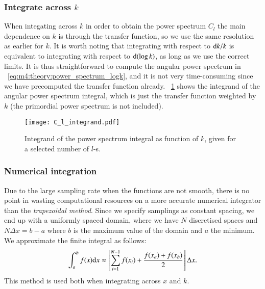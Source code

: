     \subsubsection{Integrate across $k$}
        When integating across $k$ in order to obtain the power spectrum $C_l$ the main dependence on $k$ is through the transfer function, so we use the same resolution as earlier for $k$. It is worth noting that integrating with respect to $\mathrm{d} k/k$ is equivalent to integrating with respect to $\mathrm{d}(\log{k})$, as long as we use the correct limits. It is thus straightforward to compute the angular power spectrum in ~\cref{eq:m4:theory:power_spectrum_logk}, and it is not very time-consuming since we have precomputed the transfer function already. ~\cref{fig:m4:C_l_integrand} shows the integrand of the angular power spectrum integral, which is just the transfer function weighted by $k$ (the primordial power spectrum is not included). 
        \begin{figure}
            \texttt{[image: C\_l\_integrand.pdf]}
            \caption{Integrand of the power spectrum integral as function of $k$, given for a selected number of $l$-s.}
            \label{fig:m4:C_l_integrand}
        \end{figure}


    \subsubsection{Numerical integration}
        Due to the large sampling rate when the functions are not smooth, there is no point in wasting computational resources on a more accurate numerical integrator than the \textit{trapezoidal method}. Since we specify samplings as constant spacing, we end up with a uniformly spaced domain, where we have $N$ discretised spaces and $N\Delta x= b-a$ where $b$ is the maximum value of the domain and $a$ the minimum. We approximate the finite integral as follows:
        \begin{equation}
            \int_a^bf(x)\mathrm{d} x \approx \left[ \sum_{i=1}^{N-1}f(x_i) + \frac{f(x_a)+f(x_b)}{2} \right]\Delta x.
        \end{equation}
        This method is used both when integrating across $x$ and $k$. 


